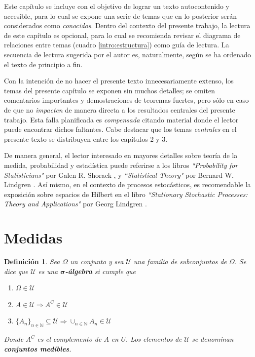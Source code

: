 \documentclass[12pt,letterpaper]{book}
\newtheorem{definicion}{Definición}[chapter]
\begin{document}
Este capítulo se incluye con el objetivo de lograr un texto autocontenido y accesible, para lo cual se expone una serie de temas que en lo posterior serán considerados como \textit{conocidos}.
%
Dentro del contexto del presente trabajo, la lectura de este capítulo es opcional, para lo cual se recomienda revisar el diagrama de relaciones entre temas (cuadro \ref{intro:estructura}) como guía de lectura.
%
La secuencia de lectura sugerida por el autor es, naturalmente, según se ha ordenado el texto de principio a fin.

Con la intención de no hacer el presente texto innecesariamente extenso, los temas del presente capítulo se exponen sin muchos detalles; se omiten comentarios importantes y demostraciones de teoremas fuertes, pero sólo en caso de que no \textit{impacten} de manera directa a los resultados centrales del presente trabajo.
%
Esta falla planificada es \textit{compensada} citando material donde el lector puede encontrar dichos faltantes.
%
Cabe destacar que los temas \textit{centrales} en el presente texto se distribuyen entre los capítulos 2 y 3.

De manera general, el lector interesado en mayores detalles sobre teoría de la medida, probabilidad y estadística puede referirse a los libros \textit{``Probability for Statisticians"} por Galen R. Shorack \cite{probabilidad_shorack}, y \textit{``Statistical Theory"} por Bernard W. Lindgren \cite{estadistica_lindgren}.
%
Así mismo, en el contexto de procesos estocásticos, es recomendable la exposición sobre espacios de Hilbert en el libro \textit{``Stationary Stochastic Processes: Theory and Applications"} por Georg Lindgren \cite{estacionariedad_lindgren}.


\section{Medidas}

\begin{definicion}%
Sea $\Omega$ un conjunto y sea $\mathcal{U}$ una familia de subconjuntos de $\Omega$. Se dice que $\mathcal{U}$ es una \textbf{$\boldsymbol{\sigma}$-álgebra} si cumple que
\begin{enumerate}[label=\MakeLowercase{\roman{*}})]
\item $\Omega \in \mathcal{U}$
\item $A \in \mathcal{U} \Rightarrow A^{C} \in \mathcal{U}$
\item $ \displaystyle \{ A_n \}_{n\in \mathbb{N}} \subseteq \mathcal{U} 
\Rightarrow \cup_{n\in \mathbb{N}} A_n \in \mathcal{U}$
\end{enumerate}
Donde $A^{C}$ es el complemento de $A$ en $U$. Los elementos de $\mathcal{U}$ se denominan \textbf{conjuntos medibles}. 
\end{definicion}
\end{document}
